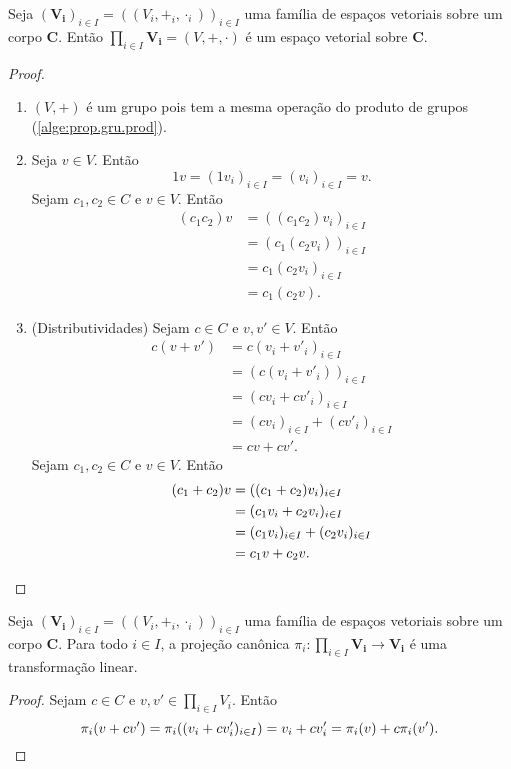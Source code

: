 \begin{prop}
Seja $(\bm{V_i})_{i \in I} = ((V_i,+_i,\cdot_i))_{i \in I}$ uma família de espaços vetoriais sobre um corpo $\bm C$. Então $\prod_{i \in I} \bm{V_i} = (V,+,\cdot)$ é um espaço vetorial sobre $\bm C$.
\end{prop}
\begin{proof}
	\begin{enumerate}
	\item $(V,+)$ é um grupo pois tem a mesma operação do produto de grupos (\ref{alge:prop.gru.prod}).
	
	\item Seja $v \in V$. Então
	\begin{equation*}
	1v = (1v_i)_{i \in I} = (v_i)_{i \in I} = v.
	\end{equation*}
	Sejam $c_1,c_2 \in C$ e $v \in V$. Então
	\begin{align*}
	(c_1c_2)v &= ((c_1c_2)v_i)_{i \in I} \\
		&= (c_1(c_2v_i))_{i \in I} \\
		&= c_1(c_2v_i)_{i \in I} \\
		&= c_1(c_2v).
	\end{align*}
	
	\item (Distributividades) Sejam $c \in C$ e $v,v' \in V$. Então
	\begin{align*}
	c(v+v') &= c(v_i+v'_i)_{i \in I} \\
		&= (c(v_i+v'_i))_{i \in I} \\
		&= (cv_i + cv'_i)_{i \in I} \\
		&= (cv_i)_{i \in I} + (cv'_i)_{i \in I} \\
		&= cv+cv'.
	\end{align*}
	Sejam $c_1,c_2 \in C$ e $v \in V$. Então
	\begin{align*}
	(c_1+c_2)v &= ((c_1+c_2)v_i)_{i \in I} \\
		&= (c_1v_i+c_2v_i)_{i \in I} \\
		&= (c_1v_i)_{i \in I} + (c_2v_i)_{i \in I} \\
		&= c_1v+c_2v. \qedhere
	\end{align*}
	\end{enumerate}
\end{proof}

\begin{prop}
Seja $(\bm{V_i})_{i \in I} = ((V_i,+_i,\cdot_i))_{i \in I}$ uma família de espaços vetoriais sobre um corpo $\bm C$. Para todo $i \in I$, a projeção canônica $\pi_i: \prod_{i \in I} \bm{V_i} \to \bm{V_i}$ é uma transformação linear.
\end{prop}
\begin{proof} Sejam $c \in C$ e $v,v' \in \prod_{i \in I} V_i$. Então
	\begin{equation*}
	\pi_i(v+cv') = \pi_i ((v_i+cv'_i)_{i \in I}) = v_i+cv'_i = \pi_i(v) + c\pi_i(v'). \qedhere
	\end{equation*}
\end{proof}

